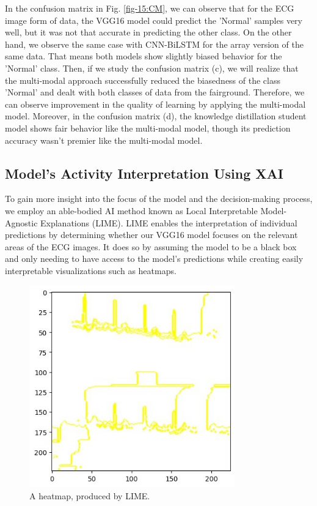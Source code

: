 \documentclass[conference]{IEEEtran}
\begin{document}
In the confusion matrix in Fig. \ref{fig-15:CM}, we can observe that for the ECG image form of data, the  VGG16 model could predict the 'Normal' samples very well, but it was not that accurate in predicting the other class. On the other hand, we observe the same case with CNN-BiLSTM for the array version of the same data. That means both models show slightly biased behavior for the 'Normal' class. Then, if we study the confusion matrix (c), we will realize that the multi-modal approach successfully reduced the biasedness of the class 'Normal' and dealt with both classes of data from the fairground. Therefore, we can observe improvement in the quality of learning by applying the multi-modal model. Moreover, in the confusion matrix (d), the knowledge distillation student model shows fair behavior like the multi-modal model, though its prediction accuracy wasn't premier like the multi-modal model.


\subsection{Model's Activity Interpretation Using XAI}

To gain more insight into the focus of the model and the decision-making process, we employ an able-bodied AI method known as Local Interpretable Model-Agnostic Explanations (LIME). LIME enables the interpretation of individual predictions by determining whether our VGG16 model focuses on the relevant areas of the ECG images. It does so by assuming the model to be a black box and only needing to have access to the model’s predictions while creating easily interpretable visualizations such as heatmaps.

\begin{figure}[htbp]
\centerline{\includegraphics[width=3.5in]{16-LIME.jpg}}
\caption{A heatmap, produced by LIME.}
\label{fig-16:LIME}
\end{figure}
\end{document}
